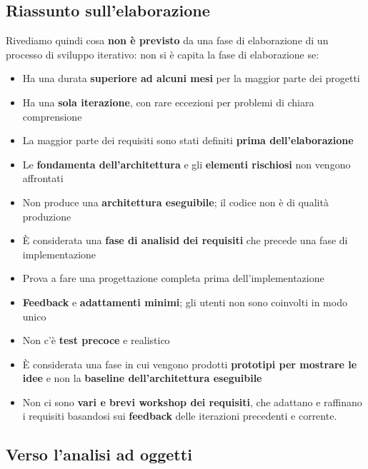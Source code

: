 \documentclass[12pt]{article}
\newcommand{\tb}{\textbf}
\begin{document}
\subsection{Riassunto sull'elaborazione}
Rivediamo quindi cosa \tb{non è previsto} da una fase di elaborazione di un processo di sviluppo iterativo: non si è capita la fase di elaborazione se:
\begin{itemize}
    \item Ha una durata \tb{superiore ad alcuni mesi} per la maggior parte dei progetti
    \item Ha una \tb{sola iterazione}, con rare eccezioni per problemi di chiara comprensione
    \item La maggior parte dei requisiti sono stati definiti \tb{prima dell'elaborazione}
    \item Le \tb{fondamenta dell'architettura} e gli \tb{elementi rischiosi} non vengono affrontati
    \item Non produce una \tb{architettura eseguibile}; il codice non è di qualità produzione
    \item È considerata una \tb{fase di analisid dei requisiti} che precede una fase di implementazione
    \item Prova a fare una progettazione completa prima dell'implementazione
    \item \tb{Feedback} e \tb{adattamenti minimi}; gli utenti non sono coinvolti in modo unico
    \item Non c'è \tb{test precoce} e realistico
    \item È considerata una fase in cui vengono prodotti \tb{prototipi per mostrare le idee} e non la \tb{baseline dell'architettura eseguibile}
    \item Non ci sono \tb{vari e brevi workshop dei requisiti}, che adattano e raffinano i requisiti basandosi sui \tb{feedback} delle iterazioni precedenti e corrente.
\end{itemize}
\subsection{Verso l'analisi ad oggetti}
\end{document}
